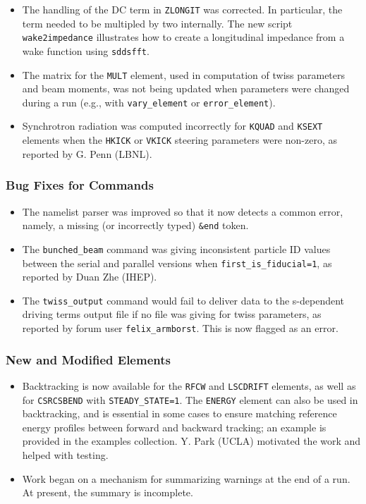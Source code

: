 \documentclass[11pt]{article}
\begin{document}
\begin{itemize}
  The new script \verb|trwake2impedance| illustrates how to create a transverse impedance from a wake function using \verb|sddsfft|.
\item The handling of the DC term in \verb|ZLONGIT| was corrected.  In particular, the term needed to be multipled by 
  two internally.  The new script \verb|wake2impedance| illustrates how to create a longitudinal impedance from a wake 
  function using \verb|sddsfft|.
\item The matrix for the \verb|MULT| element, used in computation of twiss parameters and beam moments, was not being updated
  when parameters were changed during a run (e.g., with \verb|vary_element| or \verb|error_element|).
\item Synchrotron radiation was computed incorrectly for \verb|KQUAD| and \verb|KSEXT| elements when the \verb|HKICK| or
  \verb|VKICK| steering parameters were non-zero, as reported by G. Penn (LBNL).
\end{itemize}

\subsubsection{Bug Fixes for Commands}
\begin{itemize}
\item The namelist parser was improved so that it now detects a common error, namely, a missing (or incorrectly typed)
  \verb|&end| token.
\item The \verb|bunched_beam| command was giving inconsistent particle ID values between the serial and parallel versions
  when \verb|first_is_fiducial=1|, as reported by Duan Zhe (IHEP).
\item The \verb|twiss_output| command would fail to deliver data to the s-dependent driving terms output file if
  no file was giving for twiss parameters, as reported by forum user \verb|felix_armborst|. This is now flagged as an 
  error.
\end{itemize}

\subsubsection{New and Modified Elements}
\begin{itemize}
\item Backtracking is now available for the \verb|RFCW| and \verb|LSCDRIFT| elements, as well as for \verb|CSRCSBEND| with
  \verb|STEADY_STATE=1|. The \verb|ENERGY| element can also be used in backtracking, and is essential in some cases to
  ensure matching reference energy profiles between forward and backward tracking; an example is provided in the
  examples collection.  Y. Park (UCLA) motivated the work and helped with testing.
\item Work began on a mechanism for summarizing warnings at the end of a run. At present, the summary is incomplete.
\end{itemize}
\end{document}
